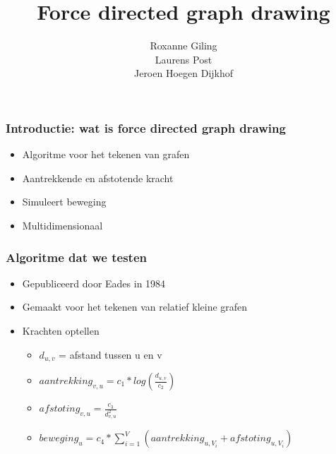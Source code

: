 \documentclass[16pt]{beamer}
\title{\textbf{Force directed graph drawing}}
\author{Roxanne Giling\\
		Laurens Post\\
		Jeroen Hoegen Dijkhof}
\date{}
\begin{document}
\begin{frame}
    \frametitle{\maketitle}
\end{frame}

\begin{frame}
    \frametitle{Introductie: wat is force directed graph drawing}
    \begin{itemize}
        \item{Algoritme voor het tekenen van grafen}
        \item{Aantrekkende en afstotende kracht}
        \item{Simuleert beweging}
        \item{Multidimensionaal}
    \end{itemize}
\end{frame}

\begin{frame}
    \frametitle{Algoritme dat we testen}
    \begin{itemize}
        \item{Gepubliceerd door Eades in 1984}
        \item{Gemaakt voor het tekenen van relatief kleine grafen}
        \item{Krachten optellen}
        \begin{itemize}
            \item{
                 $d_{u,v}$ = afstand tussen u en v
            }
            \item{
                \begin{math}
                    aantrekking_{v,u} = c_1 * log(\frac{d_{u,v}}{c_2})
                \end{math}
            }
            \item{
                \begin{math}
                    afstoting_{v,u} = \frac{c_3}{d_{v,u}^2}
                \end{math}
            }
            \item {
                \begin{math}
                    beweging_u = c_4 * \sum_{i=1}^V{(aantrekking_{u,V_i} + afstoting_{u,V_i})}
                \end{math}
            }
        \end{itemize}
    \end{itemize}
\end{frame}
\end{document}
